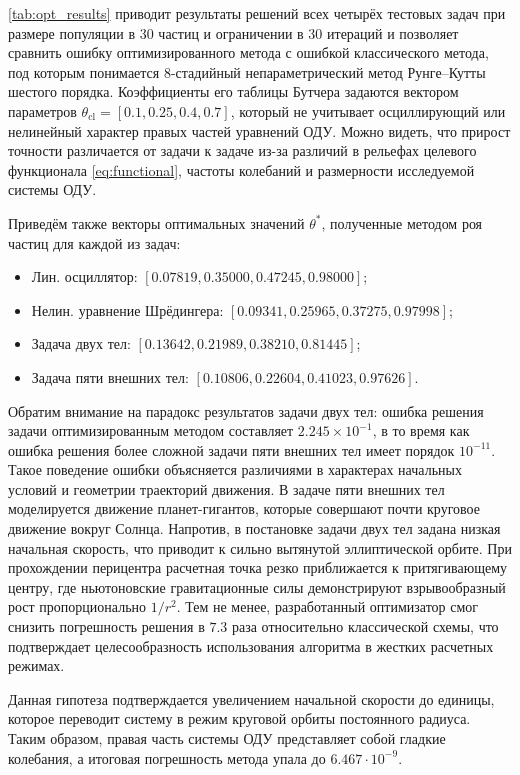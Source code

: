 \autoref{tab:opt_results} приводит результаты решений всех четырёх тестовых задач при размере популяции в 30 частиц и ограничении в 30 итераций и позволяет сравнить ошибку оптимизированного метода с ошибкой классического метода, под которым понимается 8-стадийный непараметрический метод Рунге--Кутты шестого порядка. Коэффициенты его таблицы Бутчера задаются вектором параметров $\theta_{\text{cl}} = [0.1, 0.25, 0.4, 0.7]$, который не учитывает осциллирующий или нелинейный характер правых частей уравнений ОДУ.  Можно видеть, что прирост точности различается от задачи к задаче из-за различий в рельефах целевого функционала \eqref{eq:functional}, частоты колебаний и размерности исследуемой системы ОДУ.



Приведём также векторы оптимальных значений $\theta^*$, полученные методом роя частиц для каждой из задач:
\begin{itemize}
	\item Лин. осциллятор: $[0.07819, 0.35000, 0.47245, 0.98000]$;
	\item Нелин. уравнение Шрёдингера: $[0.09341, 0.25965, 0.37275, 0.97998]$;
	\item Задача двух тел: $[0.13642, 0.21989, 0.38210, 0.81445]$;
	\item Задача пяти внешних тел: $[0.10806, 0.22604, 0.41023, 0.97626]$.
\end{itemize}

Обратим внимание на парадокс результатов задачи двух тел: ошибка решения задачи оптимизированным методом составляет $2.245 \times 10^{-1}$, в то время как ошибка решения более сложной задачи пяти внешних тел имеет порядок $10^{-11}$. Такое поведение ошибки объясняется различиями в характерах начальных условий и геометрии траекторий движения. В задаче пяти внешних тел моделируется движение планет-гигантов, которые совершают почти круговое движение вокруг Солнца. Напротив, в постановке задачи двух тел задана низкая начальная скорость, что приводит к сильно вытянутой эллиптической орбите. При прохождении перицентра расчетная точка резко приближается к притягивающему центру, где ньютоновские гравитационные силы демонстрируют взрывообразный рост пропорционально $1/r^2$. Тем не менее, разработанный оптимизатор смог снизить погрешность решения в $7.3$ раза относительно классической схемы, что подтверждает целесообразность использования алгоритма в жестких расчетных режимах.

Данная гипотеза подтверждается увеличением начальной скорости до единицы, которое переводит систему в режим круговой орбиты постоянного радиуса. Таким образом, правая часть системы ОДУ представляет собой гладкие колебания, а итоговая погрешность метода упала до $6.467 \cdot 10^{-9}$.

